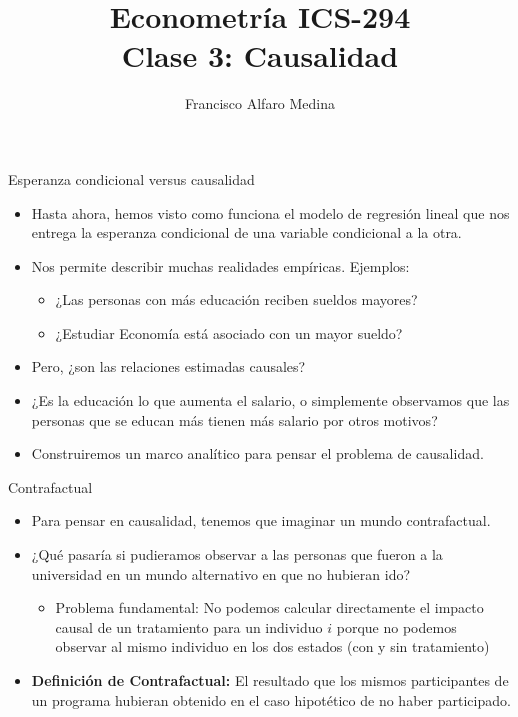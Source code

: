 \documentclass[10pt]{beamer}
\title[ICS-162]{Econometría ICS-294\\ \small{Clase 3: Causalidad}}
\author{Francisco Alfaro Medina}
\institute[USM]
{Universidad Técnica Federico Santa María\\ %
	\medskip
	\textit{} %
	
}
\date{}
\begin{document}
	
\begin{frame}
	\titlepage %

\end{frame}

\begin{frame}{Esperanza condicional versus causalidad}
    \begin{itemize}
        \item Hasta ahora, hemos visto como funciona el modelo de regresión lineal que nos entrega la esperanza condicional de una variable condicional a la otra.
        \item Nos permite describir muchas realidades empíricas. Ejemplos:
        \begin{itemize}
            \item ¿Las personas con más educación reciben sueldos mayores?
            \item ¿Estudiar Economía está asociado con un mayor sueldo?
        \end{itemize}
        \item Pero, ¿son las relaciones estimadas causales?
        \item ¿Es la educación lo que aumenta el salario, o simplemente observamos que las personas que se educan más tienen más salario por otros motivos?
        \item Construiremos un marco analítico para pensar el problema de causalidad.
    \end{itemize}
\end{frame}

\begin{frame}{Contrafactual}
    \begin{itemize}
        \item Para pensar en causalidad, tenemos que imaginar un mundo contrafactual.
        \item ¿Qué pasaría si pudieramos observar a las personas que fueron a la universidad en un mundo alternativo en que no hubieran ido?
        \begin{itemize}
            \item Problema fundamental: No podemos calcular directamente el impacto causal de un tratamiento para un individuo $i$ porque no podemos observar al mismo individuo en los dos estados (con y sin tratamiento)
        \end{itemize}
        \item \textbf{Definición de Contrafactual:} El resultado que los mismos participantes de un programa hubieran obtenido en el caso hipotético de no haber participado.
    \end{itemize}
\end{frame}
\end{document}
